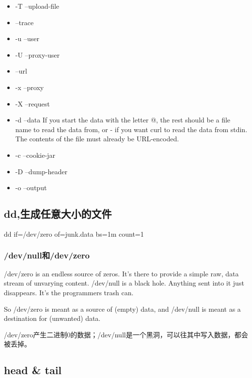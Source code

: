 \begin{itemize}
\item -T --upload-file

\item --trace

\item -u --user
\item -U --proxy-user

\item --url

\item -x --proxy

\item -X --request


\item -d --data
If  you  start  the data with the letter @, the rest should be a file name to read the data from, or - if you want curl  to  read the  data  from stdin.  The contents of the file must already be URL-encoded. 
\item -c --cookie-jar
\item -D --dump-header
\item -o --output

\end{itemize}

\subsection{dd,生成任意大小的文件}

\begin{Bash}

dd if=/dev/zero of=junk.data bs=1m count=1

\end{Bash}

\subsubsection{/dev/null和/dev/zero}

/dev/zero is an endless source of zeros. It's there to provide a simple raw, data stream of unvarying content. /dev/null is a black hole. Anything sent into it just disappears. It's the programmers trash can.

So /dev/zero is meant as a source of (empty) data, and /dev/null is meant as a destination for (unwanted) data.

/dev/zero产生二进制0的数据；/dev/null是一个黑洞，可以往其中写入数据，都会被丢掉。


\subsection{head \& tail}

